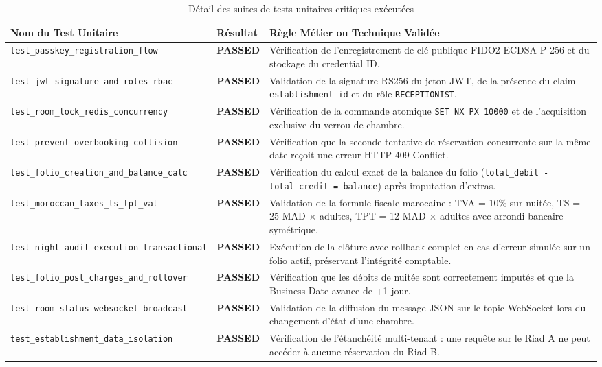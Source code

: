 \documentclass[12pt,a4paper,oneside]{report}
\begin{document}
\begin{table}[H]
\centering
\small
\renewcommand{\arraystretch}{1.3}
\begin{tabularx}{\textwidth}{|p{4.2cm}|p{2.2cm}|X|}
\hline
\textbf{Nom du Test Unitaire} & \textbf{Résultat} & \textbf{Règle Métier ou Technique Validée} \\
\hline
\texttt{test\_passkey\_registration\_flow} & \textbf{PASSED} & Vérification de l'enregistrement de clé publique FIDO2 ECDSA P-256 et du stockage du credential ID. \\
\hline
\texttt{test\_jwt\_signature\_and\_roles\_rbac} & \textbf{PASSED} & Validation de la signature RS256 du jeton JWT, de la présence du claim \texttt{establishment\_id} et du rôle \texttt{RECEPTIONIST}. \\
\hline
\texttt{test\_room\_lock\_redis\_concurrency} & \textbf{PASSED} & Vérification de la commande atomique \texttt{SET NX PX 10000} et de l'acquisition exclusive du verrou de chambre. \\
\hline
\texttt{test\_prevent\_overbooking\_collision} & \textbf{PASSED} & Vérification que la seconde tentative de réservation concurrente sur la même date reçoit une erreur HTTP 409 Conflict. \\
\hline
\texttt{test\_folio\_creation\_and\_balance\_calc} & \textbf{PASSED} & Vérification du calcul exact de la balance du folio (\texttt{total\_debit - total\_credit = balance}) après imputation d'extras. \\
\hline
\texttt{test\_moroccan\_taxes\_ts\_tpt\_vat} & \textbf{PASSED} & Validation de la formule fiscale marocaine : TVA = 10\% sur nuitée, TS = 25 MAD $\times$ adultes, TPT = 12 MAD $\times$ adultes avec arrondi bancaire symétrique. \\
\hline
\texttt{test\_night\_audit\_execution\_transactional} & \textbf{PASSED} & Exécution de la clôture avec rollback complet en cas d'erreur simulée sur un folio actif, préservant l'intégrité comptable. \\
\hline
\texttt{test\_folio\_post\_charges\_and\_rollover} & \textbf{PASSED} & Vérification que les débits de nuitée sont correctement imputés et que la Business Date avance de +1 jour. \\
\hline
\texttt{test\_room\_status\_websocket\_broadcast} & \textbf{PASSED} & Validation de la diffusion du message JSON sur le topic WebSocket lors du changement d'état d'une chambre. \\
\hline
\texttt{test\_establishment\_data\_isolation} & \textbf{PASSED} & Vérification de l'étanchéité multi-tenant : une requête sur le Riad A ne peut accéder à aucune réservation du Riad B. \\
\hline
\end{tabularx}
\caption{Détail des suites de tests unitaires critiques exécutées}
\label{tab:cas_tests_unitaires}
\end{table}
\end{document}
